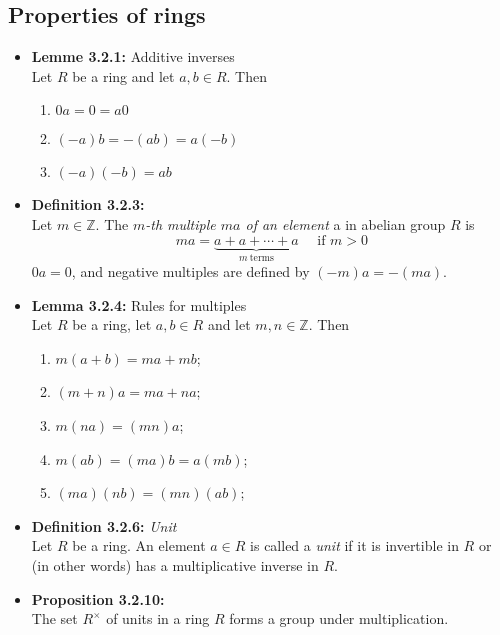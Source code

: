 \documentclass[11pt,a4paper]{article}
\begin{document}
\subsection{Properties of rings}

\begin{itemize}

    \item \textbf{Lemme 3.2.1:} Additive inverses \\
        Let $R$ be a ring and let $a, b \in R$.
        Then
        \begin{enumerate}
            \item $0a = 0 = a0$
            \item $(-a)b = -(ab) = a(-b)$
            \item $(-a)(-b) = ab$
        \end{enumerate}

    \item \textbf{Definition 3.2.3:} \\
        Let $m \in \mathbb{Z}$.
        The \emph{$m$-th multiple $ma$ of an element} a in abelian group $R$ is
        \[
            ma = \underbrace{a + a + \cdots + a}_{m \ \text{terms}} \quad \text{ if } m > 0
        \]
        $0a = 0$, and negative multiples are defined by $(-m)a = -(ma)$.

    \item \textbf{Lemma 3.2.4:} Rules for multiples \\
        Let $R$ be a ring, let $a,b \in R$ and let $m,n \in \mathbb{Z}$.
        Then
        \begin{enumerate}
            \item $m(a+b) = ma + mb$;
            \item $(m+n)a = ma + na$;
            \item $m(na) = (mn)a$;
            \item $m(ab) = (ma)b = a(mb)$;
            \item $(ma)(nb) = (mn)(ab)$;
        \end{enumerate}

    \item \textbf{Definition 3.2.6:} \emph{Unit} \\
        Let $R$ be a ring.
        An element $a \in R$ is called a \emph{unit} if it is invertible in $R$ or (in other words)
        has a multiplicative inverse in $R$.

    \item \textbf{Proposition 3.2.10:} \\
        The set $R^\times$ of units in a ring $R$ forms a group under multiplication.


\end{itemize}
\end{document}
